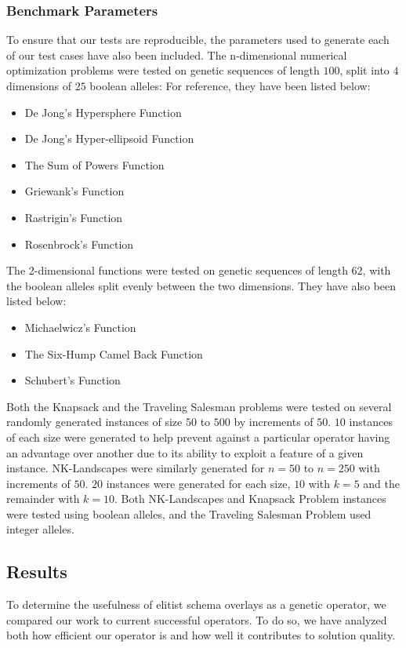 \subsubsection*{Benchmark Parameters}
To ensure that our tests are reproducible, the parameters used to generate each of our test cases have also been included. The n-dimensional numerical optimization problems were tested on genetic sequences of length $100$, split into $4$ dimensions of $25$ boolean alleles: For reference, they have been listed below:

\begin{itemize}
\item De Jong's Hypersphere Function
\item De Jong's Hyper-ellipsoid Function
\item The Sum of Powers Function
\item Griewank's Function
\item Rastrigin's Function
\item Rosenbrock's Function
\end{itemize} 

The 2-dimensional functions were tested on genetic sequences of length $62$, with the boolean alleles split evenly between the two dimensions. They have also been listed below:

\begin{itemize}
\item Michaelwicz's Function
\item The Six-Hump Camel Back Function
\item Schubert's Function
\end{itemize}

Both the Knapsack and the Traveling Salesman problems were tested on several randomly generated instances of size $50$ to $500$ by increments of $50$. $10$ instances of each size were generated to help prevent against a particular operator having an advantage over another due to its ability to exploit a feature of a given instance. NK-Landscapes were similarly generated for $n = 50$ to $n = 250$ with increments of $50$. $20$ instances were generated for each size, $10$ with $k = 5$ and the remainder with $k = 10$. Both NK-Landscapes and Knapsack Problem instances were tested using boolean alleles, and the Traveling Salesman Problem used integer alleles.

\subsection*{Results}
To determine the usefulness of elitist schema overlays as a genetic operator, we compared our work to current successful operators. To do so, we have analyzed both how efficient our operator is and how well it contributes to solution quality. 

